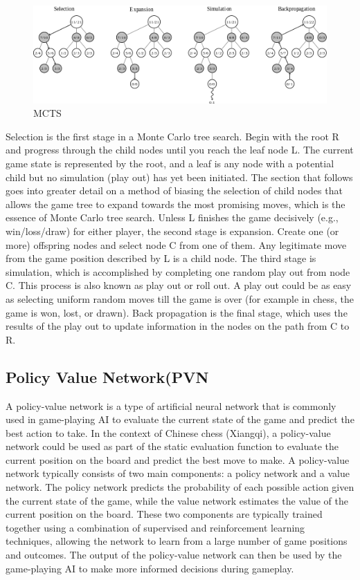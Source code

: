 \documentclass[10pt,twocolumn]{article}
\begin{document}
	\begin{figure}
        \includegraphics[width=\linewidth]{MCTS.png}
        \caption{MCTS}
        \label{fig1:Monte Carlo Tree search}
    \end{figure}
	
	Selection is the first stage in a Monte Carlo tree search. Begin with the root R and progress through the child nodes until you reach the leaf node L. The current game state is represented by the root, and a leaf is any node with a potential child but no simulation (play out) has yet been initiated. The section that follows goes into greater detail on a method of biasing the selection of child nodes that allows the game tree to expand towards the most promising moves, which is the essence of Monte Carlo tree search. Unless L finishes the game decisively (e.g., win/loss/draw) for either player, the second stage is expansion.\cite{Report} Create one (or more) offspring nodes and select node C from one of them. Any legitimate move from the game position described by L is a child node. The third stage is simulation, which is accomplished by completing one random play out from node C. This process is also known as play out or roll out. A play out could be as easy as selecting uniform random moves till the game is over (for example in chess, the game is won, lost, or drawn). Back propagation is the final stage, which uses the results of the play out to update information in the nodes on the path from C to R.
\subsection{Policy Value Network(PVN}
    A policy-value network is a type of artificial neural network that is commonly used in game-playing AI to evaluate the current state of the game and predict the best action to take. In the context of Chinese chess (Xiangqi), a policy-value network could be used as part of the static evaluation function to evaluate the current position on the board and predict the best move to make. A policy-value network typically consists of two main components: a policy network and a value network. The policy network predicts the probability of each possible action given the current state of the game, while the value network estimates the value of the current position on the board. These two components are typically trained together using a combination of supervised and reinforcement learning techniques, allowing the network to learn from a large number of game positions and outcomes. The output of the policy-value network can then be used by the game-playing AI to make more informed decisions during gameplay.
	
\end{document}
